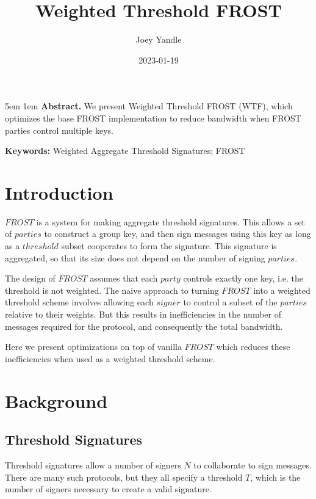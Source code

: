 \documentclass{article}
\title{Weighted Threshold FROST}
\date{2023-01-19}
\author{Joey Yandle}
\begin{document}
\maketitle

\begingroup
\leftskip5em
\parskip1em
\rightskip\leftskip
\noindent\textbf{Abstract.} We present Weighted Threshold FROST (WTF), which optimizes the base FROST implementation to reduce bandwidth when FROST parties control multiple keys.

\par
\noindent\textbf{Keywords:} Weighted Aggregate Threshold Signatures; FROST
\par
\endgroup

\section{
  Introduction
}

$FROST$ \cite{frost} is a system for making aggregate threshold signatures.  This allows a set of $parties$ to construct a group key, and then sign messages using this key as long as a $threshold$ subset cooperates to form the signature.  This signature is aggregated, so that its size does not depend on the number of signing $parties$.

The design of $FROST$ assumes that each $party$ controls exactly one key, i.e. the threshold is not weighted.  The naive approach to turning $FROST$ into a weighted threshold scheme involves allowing each $signer$ to control a subset of the $parties$ relative to their weights.  But this results in inefficiencies in the number of messages required for the protocol, and consequently the total bandwidth.

Here we present optimizations on top of vanilla $FROST$ which reduces these inefficiencies when used as a weighted threshold scheme.  


\newpage
\section{
  Background
}

\subsection{
  Threshold Signatures
}

Threshold signatures allow a number of signers $N$ to collaborate to sign messages.  There are many such protocols, but they all specify a threshold $T$, which is the number of signers necessary to create a valid signature.  
\end{document}
